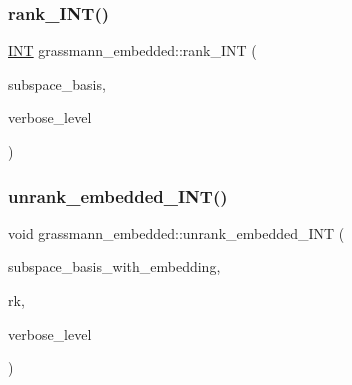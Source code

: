 \mbox{\label{classgrassmann__embedded_a6f7074d4d7351b21a0142a9c5071ed5e}} 
\subsubsection{\texorpdfstring{rank\+\_\+\+I\+N\+T()}{rank\_INT()}}
{\footnotesize\ttfamily \mbox{\hyperlink{galois_8h_a09fddde158a3a20bd2dcadb609de11dc}{I\+NT}} grassmann\+\_\+embedded\+::rank\+\_\+\+I\+NT (\begin{DoxyParamCaption}\item[{\mbox{\hyperlink{galois_8h_a09fddde158a3a20bd2dcadb609de11dc}{I\+NT}} $\ast$}]{subspace\+\_\+basis,  }\item[{\mbox{\hyperlink{galois_8h_a09fddde158a3a20bd2dcadb609de11dc}{I\+NT}}}]{verbose\+\_\+level }\end{DoxyParamCaption})}

\mbox{\label{classgrassmann__embedded_a373f89c0c8e95d6126c59cf62dc935c0}} 
\subsubsection{\texorpdfstring{unrank\+\_\+embedded\+\_\+\+I\+N\+T()}{unrank\_embedded\_INT()}}
{\footnotesize\ttfamily void grassmann\+\_\+embedded\+::unrank\+\_\+embedded\+\_\+\+I\+NT (\begin{DoxyParamCaption}\item[{\mbox{\hyperlink{galois_8h_a09fddde158a3a20bd2dcadb609de11dc}{I\+NT}} $\ast$}]{subspace\+\_\+basis\+\_\+with\+\_\+embedding,  }\item[{\mbox{\hyperlink{galois_8h_a09fddde158a3a20bd2dcadb609de11dc}{I\+NT}}}]{rk,  }\item[{\mbox{\hyperlink{galois_8h_a09fddde158a3a20bd2dcadb609de11dc}{I\+NT}}}]{verbose\+\_\+level }\end{DoxyParamCaption})}

\mbox{\label{classgrassmann__embedded_a5e9b8701fd62efb2d4e3ad9174a3c0b4}} 
